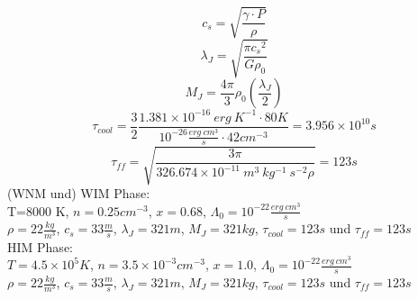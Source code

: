 \begin{equation}
c_{s}=\sqrt{\frac{\gamma \cdot P}{\rho}}
\end{equation}
\begin{equation}
\lambda_{J}=\sqrt{\frac{\pi {c_s}^2}{G \rho_0}}
\end{equation}
\begin{equation}
M_{J}=\frac{4 \pi}{3} \rho_0 \left ( \frac{\lambda_J}{2} \right)
\end{equation}
\begin{equation}
\tau_{cool}=\frac{3}{2} \frac{1.381 \times 10^{-16}~erg~K^{-1} \cdot 80 K}{10^{-26} \frac{erg~cm^3}{s} \cdot 42 cm^{-3}} = 3.956 \times 10^{10} s
\end{equation}
\begin{equation}
\tau_{ff}= \sqrt{\frac{3 \pi}{32 6.674 \times 10^{-11}~m^3~kg^{-1}~s^{-2} \rho}} = 123 s
\end{equation}
(WNM und) WIM Phase: \\
T=8000 K, $n = 0.25 cm^{-3}$, $x=0.68$, $\Lambda_0 = 10^{-22} \frac{erg~cm^3}{s}$\\
$\rho= 22 \frac{kg}{m^3}$, $c_{s}=33 \frac{m}{s}$, $\lambda_{J}= 321 m$, $M_{J}= 321 kg$, $\tau_{cool} = 123 s$ und $\tau_{ff} = 123 s$\\
HIM Phase: \\
$T=4.5 \times 10^{5} K$, $n = 3.5 \times 10^{-3} cm^{-3}$, $x=1.0$, $\Lambda_0 = 10^{-22} \frac{erg~cm^3}{s}$\\
$\rho= 22 \frac{kg}{m^3}$, $c_{s}=33 \frac{m}{s}$, $\lambda_{J}= 321 m$, $M_{J}= 321 kg$, $\tau_{cool} = 123 s$ und $\tau_{ff} = 123 s$\\
